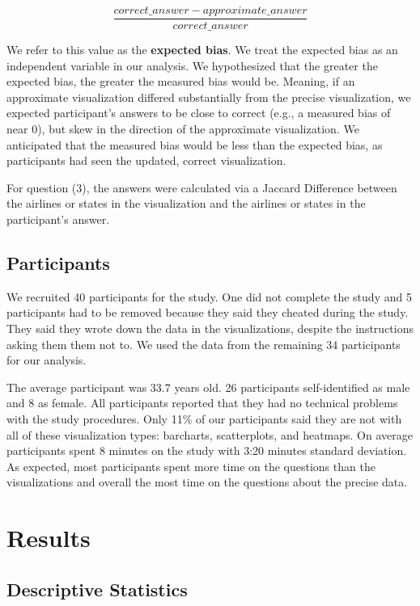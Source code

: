 \documentclass[10pt,journal,compsoc]{IEEEtran}
\begin{document}
\[\frac{correct\_answer - approximate\_answer}{correct\_answer}\]

We refer to this value as the \textbf{expected bias}.
We treat the expected bias as an independent variable in our analysis.
We hypothesized that the greater the expected bias, the greater the measured bias would be.
Meaning, if an approximate visualization differed substantially from the precise visualization, we expected participant's answers to be close to correct (e.g., a measured bias of near 0), but skew in the direction of the approximate visualization.
We anticipated that the measured bias would be less than the expected bias, as participants had seen the updated, correct visualization.

For question (3), the answers were calculated via a Jaccard Difference between the airlines or states in the visualization and the airlines or states in the participant's answer.

\subsection{Participants}

We recruited 40 participants for the study.
One did not complete the study and 5 participants had to be removed because they said they cheated during the study.
They said they wrote down the data in the visualizations, despite the instructions asking them them not to.
We used the data from the remaining 34 participants for our analysis.

The average participant was 33.7 years old.
26 participants self-identified as male and 8 as female.
All participants reported that they had no technical problems with the study procedures.
Only 11\% of our participants said they are not with all of these visualization types: barcharts, scatterplots, and heatmaps.
On average participants spent 8 minutes on the study with 3:20 minutes standard deviation.
As expected, most participants spent more time on the questions than the visualizations and overall the most time on the questions about the precise data.

\section{Results}\label{sec:results}

\subsection{Descriptive Statistics}
\end{document}
